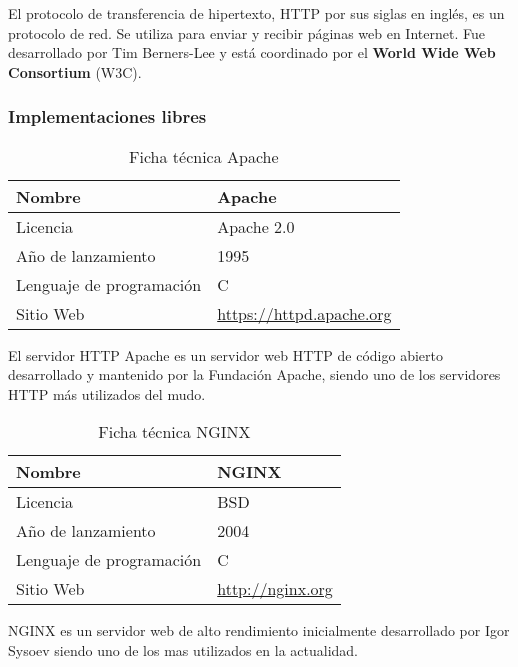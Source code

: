 El protocolo de transferencia de hipertexto, HTTP por sus siglas en inglés, es un protocolo de red. Se utiliza para enviar y recibir páginas web en Internet. Fue desarrollado por Tim Berners-Lee y está coordinado por el \textbf{World Wide Web Consortium} (W3C).

\subsubsection {Implementaciones libres}

\begin{table}[H]
\begin{tabular}{|l|l|}
\hline
Nombre                   & Apache                       \\ \hline
Licencia                 & Apache 2.0                        \\ \hline
Año de lanzamiento       & 1995                         \\ \hline
Lenguaje de programación & C                            \\ \hline
Sitio Web                & \url{https://httpd.apache.org} \\ \hline
\end{tabular}
\caption{Ficha técnica Apache}
\end{table}

El servidor HTTP Apache es un servidor web HTTP de código abierto desarrollado y mantenido por la Fundación Apache, siendo uno de los servidores HTTP más utilizados del mudo.

\begin{table}[H]
\begin{tabular}{|l|l|}
\hline
Nombre                   & NGINX                       \\ \hline
Licencia                 & BSD                        \\ \hline
Año de lanzamiento       & 2004                        \\ \hline
Lenguaje de programación & C                            \\ \hline
Sitio Web                & \url{http://nginx.org} \\ \hline
\end{tabular}
\caption{Ficha técnica NGINX}
\end{table}

NGINX es un servidor web de alto rendimiento inicialmente desarrollado por Igor Sysoev siendo uno de los mas utilizados en la actualidad.

